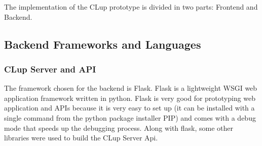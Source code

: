 The implementation of the CLup prototype is divided in two parts: Frontend and Backend.

\subsection{Backend Frameworks and Languages}

\subsubsection{CLup Server and API}
The framework chosen for the backend is Flask. Flask is a lightweight WSGI web application framework written in python. Flask is very good for prototyping web application and APIs because it is very easy to set up (it can be installed with a single command from the python package installer PIP) and comes with a debug mode that speeds up the debugging process.
Along with flask, some other libraries were used to build the CLup Server Api.
